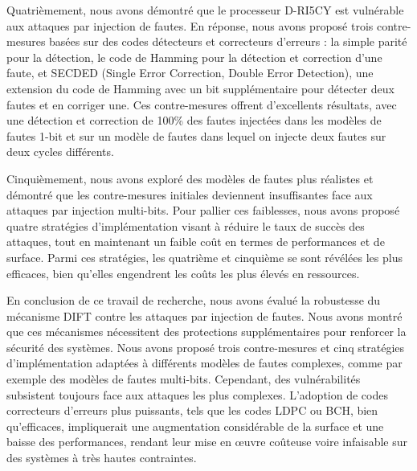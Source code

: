 Quatrièmement, nous avons démontré que le processeur D-RI5CY est vulnérable aux attaques par injection de fautes. En réponse, nous avons proposé trois contre-mesures basées sur des codes détecteurs et correcteurs d’erreurs : la simple parité pour la détection, le code de Hamming pour la détection et correction d’une faute, et SECDED (Single Error Correction, Double Error Detection), une extension du code de Hamming avec un bit supplémentaire pour détecter deux fautes et en corriger une. Ces contre-mesures offrent d'excellents résultats, avec une détection et correction de 100\% des fautes injectées dans les modèles de fautes 1-bit et sur un modèle de fautes dans lequel on injecte deux fautes sur deux cycles différents.

Cinquièmement, nous avons exploré des modèles de fautes plus réalistes et démontré que les contre-mesures initiales deviennent insuffisantes face aux attaques par injection multi-bits. Pour pallier ces faiblesses, nous avons proposé quatre stratégies d'implémentation visant à réduire le taux de succès des attaques, tout en maintenant un faible coût en termes de performances et de surface. Parmi ces stratégies, les quatrième et cinquième se sont révélées les plus efficaces, bien qu’elles engendrent les coûts les plus élevés en ressources.

En conclusion de ce travail de recherche, nous avons évalué la robustesse du mécanisme DIFT contre les attaques par injection de fautes. Nous avons montré que ces mécanismes nécessitent des protections supplémentaires pour renforcer la sécurité des systèmes. Nous avons proposé trois contre-mesures et cinq stratégies d’implémentation adaptées à différents modèles de fautes complexes, comme par exemple des modèles de fautes multi-bits. Cependant, des vulnérabilités subsistent toujours face aux attaques les plus complexes. L’adoption de codes correcteurs d’erreurs plus puissants, tels que les codes LDPC ou BCH, bien qu’efficaces, impliquerait une augmentation considérable de la surface et une baisse des performances, rendant leur mise en œuvre coûteuse voire infaisable sur des systèmes à très hautes contraintes.
